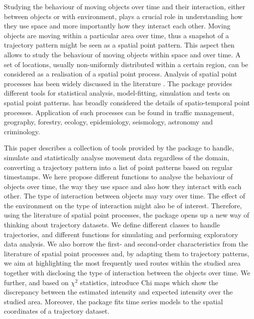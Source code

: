 \documentclass[article]{jss}
\begin{document}
Studying the behaviour of moving objects over time and their interaction, either between objects or with environment, plays a crucial role in understanding how they use space and more importantly how they interact each other. Moving objects are moving within a particular area over time, thus a snapshot of a trajectory pattern might be seen as a spatial point pattern. This aspect then allows to study the behaviour of moving objects within space and over time. A set of locations, usually non-uniformly distributed within a certain region, can be considered as a realisation of a spatial point process. Analysis of spatial point processes has been widely discussed in the literature \citep{MW03,IPSS08,D13,BRT15}. The  package  \citep{baddeley05,BRT15} provides different tools for statistical analysis, model-fitting, simulation and tests on spatial point patterns. \cite{D13} has broadly considered the details of spatio-temporal point processes. Application of such processes can be found in traffic management, geography, forestry, ecology, epidemiology, seismology, astronomy and criminology. 

This paper describes a collection of tools provided by the  package  to handle, simulate and statistically analyse movement data regardless of the domain, converting a trajectory pattern into a list of point patterns based on regular timestamps. We here propose different functions to analyse the behaviour of objects over time, the way they use space and also how they interact with each other. The type of interaction between objects may vary over time. The effect of the environment on the type of interaction might also be of interest. Therefore, using the literature of spatial point processes, the  package  opens up a new way of thinking about trajectory datasets. We define different classes to handle trajectories, and different functions for simulating and performing exploratory data analysis. We also borrow the first- and second-order characteristics from the literature of spatial point processes and, by adapting them to trajectory patterns, we aim at highlighting the most frequently used routes within the studied area together with disclosing the type of interaction between the objects over time. We further, and based on $\chi^2$ statistics, introduce Chi maps which show the discrepancy between the estimated intensity and expected intensity over the studied area. Moreover, the  package fits time series models to the spatial coordinates of a trajectory dataset.
\end{document}

